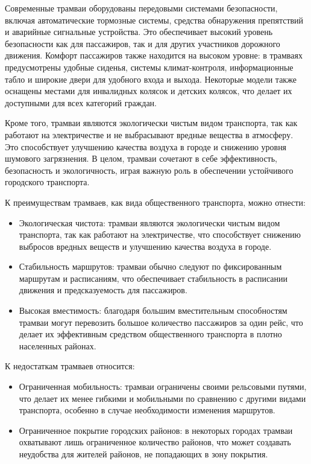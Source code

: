 Современные трамваи оборудованы передовыми системами безопасности, включая автоматические тормозные системы, средства обнаружения препятствий и аварийные сигнальные устройства. Это обеспечивает высокий уровень безопасности как для пассажиров, так и для других участников дорожного движения. Комфорт пассажиров также находится на высоком уровне: в трамваях предусмотрены удобные сиденья, системы климат-контроля, информационные табло и широкие двери для удобного входа и выхода. Некоторые модели также оснащены местами для инвалидных колясок и детских колясок, что делает их доступными для всех категорий граждан.

Кроме того, трамваи являются экологически чистым видом транспорта, так как работают на электричестве и не выбрасывают вредные вещества в атмосферу. Это способствует улучшению качества воздуха в городе и снижению уровня шумового загрязнения. В целом, трамваи сочетают в себе эффективность, безопасность и экологичность, играя важную роль в обеспечении устойчивого городского транспорта.

К преимуществам трамваев, как вида общественного транспорта, можно отнести:
\begin{itemize}
	\item Экологическая чистота: трамваи являются экологически чистым видом транспорта, так как работают на электричестве, что способствует снижению выбросов вредных веществ и улучшению качества воздуха в городе.
	\item Стабильность маршрутов: трамваи обычно следуют по фиксированным маршрутам и расписаниям, что обеспечивает стабильность в расписании движения и предсказуемость для пассажиров.
	\item Высокая вместимость: благодаря большим вместительным способностям трамваи могут перевозить большое количество пассажиров за один рейс, что делает их эффективным средством общественного транспорта в плотно населенных районах.
\end{itemize}

К недостаткам трамваев относится:
\begin{itemize}
	\item Ограниченная мобильность: трамваи ограничены своими рельсовыми путями, что делает их менее гибкими и мобильными по сравнению с другими видами транспорта, особенно в случае необходимости изменения маршрутов.
	\item Ограниченное покрытие городских районов: в некоторых городах трамваи охватывают лишь ограниченное количество районов, что может создавать неудобства для жителей районов, не попадающих в зону покрытия.
\end{itemize}

